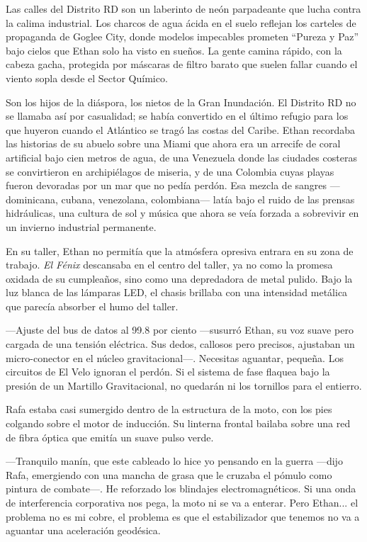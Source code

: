 \documentclass[12pt,a4paper]{book}
\begin{document}
Las calles del Distrito RD son un laberinto de neón parpadeante que lucha contra la calima industrial. Los charcos de agua ácida en el suelo reflejan los carteles de propaganda de Goglee City, donde modelos impecables prometen ``Pureza y Paz'' bajo cielos que Ethan solo ha visto en sueños. La gente camina rápido, con la cabeza gacha, protegida por máscaras de filtro barato que suelen fallar cuando el viento sopla desde el Sector Químico.

Son los hijos de la diáspora, los nietos de la Gran Inundación. El Distrito RD no se llamaba así por casualidad; se había convertido en el último refugio para los que huyeron cuando el Atlántico se tragó las costas del Caribe. Ethan recordaba las historias de su abuelo sobre una Miami que ahora era un arrecife de coral artificial bajo cien metros de agua, de una Venezuela donde las ciudades costeras se convirtieron en archipiélagos de miseria, y de una Colombia cuyas playas fueron devoradas por un mar que no pedía perdón. Esa mezcla de sangres ---dominicana, cubana, venezolana, colombiana--- latía bajo el ruido de las prensas hidráulicas, una cultura de sol y música que ahora se veía forzada a sobrevivir en un invierno industrial permanente.

En su taller, Ethan no permitía que la atmósfera opresiva entrara en su zona de trabajo. \textit{El Fénix} descansaba en el centro del taller, ya no como la promesa oxidada de su cumpleaños, sino como una depredadora de metal pulido. Bajo la luz blanca de las lámparas LED, el chasis brillaba con una intensidad metálica que parecía absorber el humo del taller.

---Ajuste del bus de datos al 99.8 por ciento ---susurró Ethan, su voz suave pero cargada de una tensión eléctrica. Sus dedos, callosos pero precisos, ajustaban un micro-conector en el núcleo gravitacional---. Necesitas aguantar, pequeña. Los circuitos de El Velo ignoran el perdón. Si el sistema de fase flaquea bajo la presión de un Martillo Gravitacional, no quedarán ni los tornillos para el entierro.

Rafa estaba casi sumergido dentro de la estructura de la moto, con los pies colgando sobre el motor de inducción. Su linterna frontal bailaba sobre una red de fibra óptica que emitía un suave pulso verde.

---Tranquilo manín, que este cableado lo hice yo pensando en la guerra ---dijo Rafa, emergiendo con una mancha de grasa que le cruzaba el pómulo como pintura de combate---. He reforzado los blindajes electromagnéticos. Si una onda de interferencia corporativa nos pega, la moto ni se va a enterar. Pero Ethan... el problema no es mi cobre, el problema es que el estabilizador que tenemos no va a aguantar una aceleración geodésica.
\end{document}

